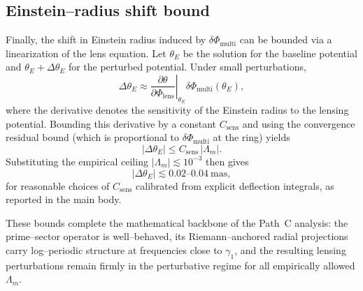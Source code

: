 \documentclass[11pt]{article}
\begin{document}
\subsection{Einstein--radius shift bound}

Finally, the shift in Einstein radius induced by $\delta\Phi_{\text{multi}}$ can be bounded via a linearization of the lens equation. Let $\theta_E$ be the solution for the baseline potential and $\theta_E + \Delta\theta_E$ for the perturbed potential. Under small perturbations,
\begin{equation}
\Delta\theta_E
\approx \left.\frac{\partial \theta}{\partial \Phi_{\text{lens}}}\right|_{\theta_E} \delta\Phi_{\text{multi}}(\theta_E),
\end{equation}
where the derivative denotes the sensitivity of the Einstein radius to the lensing potential. Bounding this derivative by a constant $C_{\text{sens}}$ and using the convergence residual bound (which is proportional to $\delta\Phi_{\text{multi}}$ at the ring) yields
\begin{equation}
|\Delta\theta_E| \leq C_{\text{sens}}\, |\Lambda_m|.
\end{equation}
Substituting the empirical ceiling $|\Lambda_m|\lesssim 10^{-3}$ then gives
\[
|\Delta\theta_E| \lesssim 0.02\text{--}0.04~\text{mas},
\]
for reasonable choices of $C_{\text{sens}}$ calibrated from explicit deflection integrals, as reported in the main body.

\bigskip

These bounds complete the mathematical backbone of the Path~C analysis: the prime--sector operator is well--behaved, its Riemann--anchored radial projections carry log--periodic structure at frequencies close to $\gamma_1$, and the resulting lensing perturbations remain firmly in the perturbative regime for all empirically allowed $\Lambda_m$.

\nocite{*}
  

\end{document}
